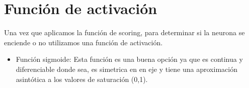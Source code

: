 \documentclass{article}
\begin{document}
\section{Función de activación}
Una vez que aplicamos la función de scoring, para determinar si la neurona se enciende o no utilizamos una función de
activación.
\begin{itemize}
 \item Función sigmoide: Esta función es una buena opción ya que es continua y diferenciable donde sea, es simetrica
 en en eje y tiene una aproximación asintótica a los valores de saturación (0,1).
 
\end{itemize}
\end{document}
